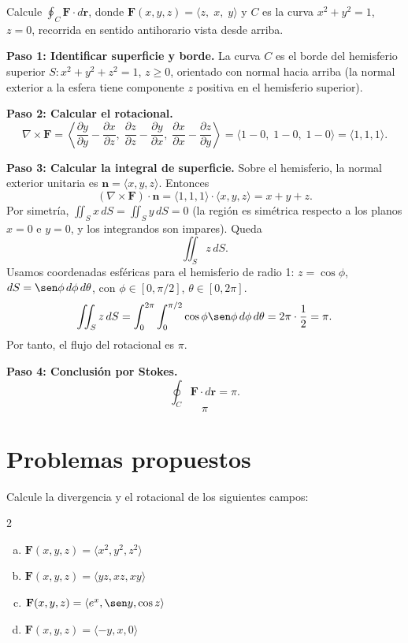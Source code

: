\begin{example}
Calcule $\displaystyle \oint_C \mathbf{F}\cdot d\mathbf{r}$, donde $\mathbf{F}(x,y,z)=\langle z,\; x,\; y\rangle$ y $C$ es la curva $x^2+y^2=1$, $z=0$, recorrida en sentido antihorario vista desde arriba.
\begin{myproof}
\textbf{Paso 1: Identificar superficie y borde.}
La curva $C$ es el borde del hemisferio superior $S: x^2+y^2+z^2=1$, $z\ge 0$, orientado con normal hacia arriba (la normal exterior a la esfera tiene componente $z$ positiva en el hemisferio superior).

\textbf{Paso 2: Calcular el rotacional.}
\[
\nabla\times\mathbf{F}
=
\left\langle
\frac{\partial y}{\partial y}-\frac{\partial x}{\partial z},\;
\frac{\partial z}{\partial z}-\frac{\partial y}{\partial x},\;
\frac{\partial x}{\partial x}-\frac{\partial z}{\partial y}
\right\rangle
=
\langle 1-0,\;1-0,\;1-0\rangle
=
\langle 1,1,1\rangle.
\]

\textbf{Paso 3: Calcular la integral de superficie.}
Sobre el hemisferio, la normal exterior unitaria es $\mathbf{n}=\langle x,y,z\rangle$. Entonces
\[
(\nabla\times\mathbf{F})\cdot\mathbf{n} = \langle 1,1,1\rangle\cdot\langle x,y,z\rangle = x+y+z.
\]
Por simetría, $\iint_S x\,dS = \iint_S y\,dS = 0$ (la región es simétrica respecto a los planos $x=0$ e $y=0$, y los integrandos son impares). Queda
\[
\iint_S z\,dS.
\]
Usamos coordenadas esféricas para el hemisferio de radio 1: $z=\cos\phi$, $dS=\sen\phi\,d\phi\,d\theta$, con $\phi\in[0,\pi/2]$, $\theta\in[0,2\pi]$.
\[
\iint_S z\,dS
= \int_0^{2\pi}\int_0^{\pi/2} \cos\phi\sen\phi\,d\phi\,d\theta
= 2\pi \cdot \frac{1}{2} = \pi.
\]
Por tanto, el flujo del rotacional es $\pi$.

\textbf{Paso 4: Conclusión por Stokes.}
\[
\oint_C \mathbf{F}\cdot d\mathbf{r} = \pi.
\]
\[
\boxed{\pi}
\]
\end{myproof}
\end{example}

\section{Problemas propuestos}

\begin{prob}
Calcule la divergencia y el rotacional de los siguientes campos:
\begin{multicols}{2}
\begin{enumerate}[(a)]
    \item $\mathbf{F}(x,y,z)=\langle x^2, y^2, z^2 \rangle$
    \item $\mathbf{F}(x,y,z)=\langle yz, xz, xy \rangle$
    \item $\mathbf{F}(x,y,z)=\langle e^x, \sen y, \cos z \rangle$
    \item $\mathbf{F}(x,y,z)=\langle -y, x, 0 \rangle$
\end{enumerate}
\end{multicols}
\end{prob}

